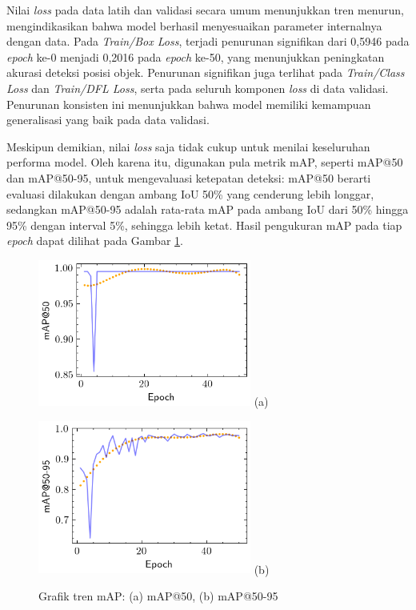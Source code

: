Nilai \textit{loss} pada data latih dan validasi secara umum
menunjukkan tren menurun, mengindikasikan bahwa model berhasil
menyesuaikan parameter internalnya dengan data. Pada
\textit{Train/Box Loss}, terjadi penurunan
signifikan dari 0,5946 pada \textit{epoch} ke-0 menjadi 0,2016 pada
\textit{epoch} ke-50, yang menunjukkan peningkatan akurasi deteksi
posisi objek. Penurunan signifikan juga terlihat pada \textit{Train/Class
Loss} dan \textit{Train/DFL Loss}, serta pada seluruh komponen
\textit{loss} di data validasi. Penurunan konsisten ini menunjukkan
bahwa model memiliki kemampuan generalisasi yang
baik pada data validasi.

Meskipun demikian, nilai \textit{loss} saja tidak cukup untuk menilai
keseluruhan performa model. Oleh karena itu, digunakan pula metrik
mAP, seperti mAP@50 dan mAP@50-95, untuk
mengevaluasi ketepatan deteksi: mAP@50 berarti evaluasi dilakukan
dengan ambang IoU 50\% yang cenderung lebih longgar, sedangkan
mAP@50-95 adalah rata-rata mAP pada ambang IoU dari 50\% hingga 95\%
dengan interval 5\%, sehingga lebih ketat. Hasil pengukuran mAP pada
tiap \textit{epoch} dapat dilihat pada Gambar \ref{fig:map}.

\begin{figure}[H]
  \centering
  \begin{minipage}[]{\textwidth}
    \centering
    \includegraphics[width=0.625\textwidth]{gambar/map50.png}
    (a)
  \end{minipage}
  \vspace{1em}

  \begin{minipage}{\textwidth}
    \centering
    \includegraphics[width=0.625\textwidth]{gambar/map5090.png}
    (b)
  \end{minipage}
  \caption{Grafik tren mAP: (a) mAP@50, (b) mAP@50-95}
  \label{fig:map}
  \vspace{-1em}
\end{figure}

